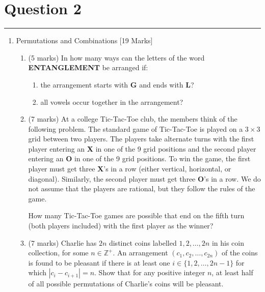 \documentclass{article}
\begin{document}
\section*{Question 2}
\hrule
\vspace{0.5cm}
\begin{enumerate}
    \item Permutations and Combinations [19 Marks]
          \begin{enumerate}
              \item (5 marks) In how many ways can the letters of the word \textbf{ENTANGLEMENT} be arranged if:

                    \begin{enumerate}
                        \item the arrangement starts with \textbf{G} and ends with \textbf{L}?
                        \item all vowels occur together in the arrangement?
                    \end{enumerate}
              \item (7 marks) At a college Tic-Tac-Toe club, the members think of the following problem. The standard game of Tic-Tac-Toe is played on a \(3 \times 3\) grid between two players. The players take alternate turns with the first player entering an \textbf{X} in one of the 9 grid positions and the second player entering an \textbf{O} in one of the 9 grid positions. To win the game, the first player must get three \textbf{X}'s in a row (either vertical, horizontal, or diagonal). Similarly, the second player must get three \textbf{O}'s in a row. We do not assume that the players are rational, but they follow the rules of the game.

                    How many Tic-Tac-Toe games are possible that end on the fifth turn (both players included) with the first player as the winner?

              \item (7 marks) Charlie has \(2n\) distinct coins labelled \(1, 2, \dots, 2n\) in his coin collection, for some \(n \in \mathbb{Z}^+\). An arrangement \((c_1, c_2, \dots, c_{2n})\) of the coins is found to be pleasant if there is at least one \(i \in \{1, 2, \dots, 2n - 1\}\) for which \(|c_i - c_{i+1}| = n\). Show that for any positive integer \(n\), at least half of all possible permutations of Charlie's coins will be pleasant.

          \end{enumerate}
\end{enumerate}
\end{document}
